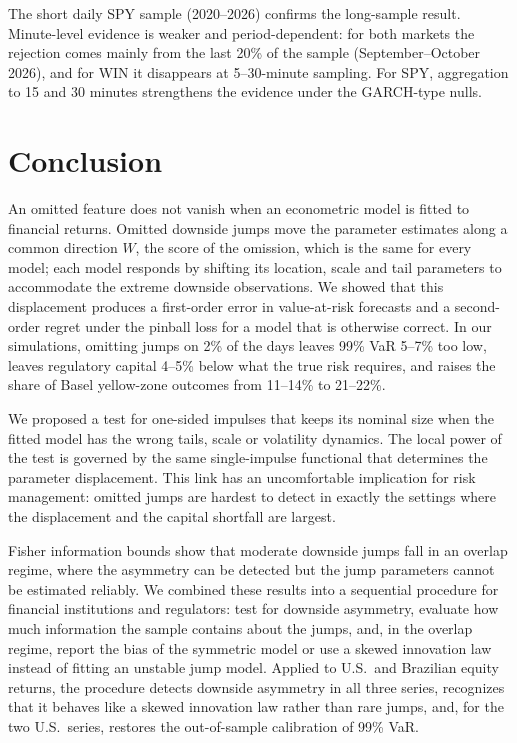 \documentclass[11pt,a4paper]{article}
\theoremstyle{definition}
\theoremstyle{remark}
\begin{document}
The short daily SPY sample (2020--2026) confirms the long-sample result. Minute-level evidence is weaker and period-dependent: for both markets the rejection comes mainly from the last 20\% of the sample (September--October 2026), and for WIN it disappears at 5--30-minute sampling. For SPY, aggregation to 15 and 30 minutes strengthens the evidence under the GARCH-type nulls.

\section{Conclusion}\label{sec:conclusion}
An omitted feature does not vanish when an econometric model is fitted to financial returns. Omitted downside jumps move the parameter estimates along a common direction $W$, the score of the omission, which is the same for every model; each model responds by shifting its location, scale and tail parameters to accommodate the extreme downside observations. We showed that this displacement produces a first-order error in value-at-risk forecasts and a second-order regret under the pinball loss for a model that is otherwise correct. In our simulations, omitting jumps on 2\% of the days leaves 99\% VaR 5--7\% too low, leaves regulatory capital 4--5\% below what the true risk requires, and raises the share of Basel yellow-zone outcomes from 11--14\% to 21--22\%.

We proposed a test for one-sided impulses that keeps its nominal size when the fitted model has the wrong tails, scale or volatility dynamics. The local power of the test is governed by the same single-impulse functional that determines the parameter displacement. This link has an uncomfortable implication for risk management: omitted jumps are hardest to detect in exactly the settings where the displacement and the capital shortfall are largest.

Fisher information bounds show that moderate downside jumps fall in an overlap regime, where the asymmetry can be detected but the jump parameters cannot be estimated reliably. We combined these results into a sequential procedure for financial institutions and regulators: test for downside asymmetry, evaluate how much information the sample contains about the jumps, and, in the overlap regime, report the bias of the symmetric model or use a skewed innovation law instead of fitting an unstable jump model. Applied to U.S.\ and Brazilian equity returns, the procedure detects downside asymmetry in all three series, recognizes that it behaves like a skewed innovation law rather than rare jumps, and, for the two U.S.\ series, restores the out-of-sample calibration of 99\% VaR.
\end{document}
